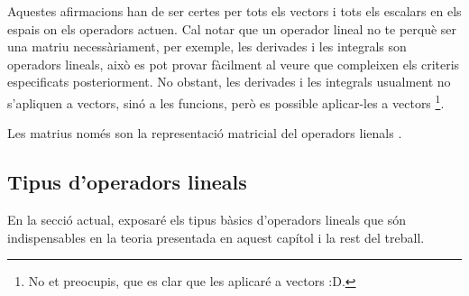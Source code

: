 Aquestes afirmacions han de ser certes per tots els vectors i tots els escalars en els espais on els operadors actuen. Cal notar que un operador lineal no te perquè ser una matriu necessàriament, per exemple, les derivades i les integrals son operadors lineals, això es pot provar fàcilment al veure que compleixen els criteris especificats posteriorment. No obstant, les derivades i les integrals usualment no s'apliquen a vectors, sinó a les funcions, però es possible aplicar-les a vectors \footnote{No et preocupis, que es clar que les aplicaré a vectors :D.}.

Les matrius només son la representació matricial del operadors lienals \cite{LR_done_right:matrix}.

	\subsection{Tipus d'operadors lineals}
En la secció actual, exposaré els tipus bàsics d'operadors lineals que són indispensables en la teoria presentada en aquest capítol i la rest del treball.

